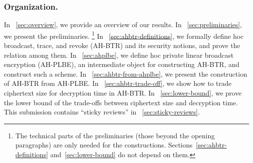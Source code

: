 \subsubsection{Organization.}
In \Section~\ref{sec:overview}, we provide an overview of our results.
In \Section~\ref{sec:preliminaries}, we present the preliminaries.%
\footnote{The technical parts of the preliminaries (those beyond the opening paragraphs) are only needed for the constructions.
Sections~\ref{sec:ahbtr-definitions} and~\ref{sec:lower-bound} do not depend on them.}
In \Section~\ref{sec:ahbtr-definitions}, we formally define \ad hoc broadcast, trace, and revoke (AH-BTR) and its security notions, and prove the relation among them.
In \Section~\ref{sec:ahplbe}, we define \ad hoc private linear broadcast encryption (AH-PLBE), an intermediate object for constructing AH-BTR, and construct such a scheme.
In \Section~\ref{sec:ahbtr-from-ahplbe}, we present the construction of AH-BTR from AH-PLBE.
In \Section~\ref{sec:ahbtr-trade-off}, we show how to trade ciphertext size for decryption time in AH-BTR.
In \Section~\ref{sec:lower-bound}, we prove the lower bound of the trade-offs between ciphertext size and decryption time.
This submission contains ``sticky reviews''
in \Section~\ref{sec:sticky-reviews}.
